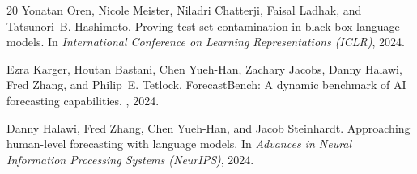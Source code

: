 \documentclass[10pt,conference]{IEEEtran}
\begin{document}
\begin{thebibliography}{20}
Yonatan Oren, Nicole Meister, Niladri Chatterji, Faisal Ladhak, and Tatsunori~B. Hashimoto.
\newblock Proving test set contamination in black-box language models.
\newblock In {\em International Conference on Learning Representations (ICLR)}, 2024.

Ezra Karger, Houtan Bastani, Chen Yueh-Han, Zachary Jacobs, Danny Halawi, Fred Zhang, and Philip~E. Tetlock.
\newblock ForecastBench: A dynamic benchmark of AI forecasting capabilities.
, 2024.

Danny Halawi, Fred Zhang, Chen Yueh-Han, and Jacob Steinhardt.
\newblock Approaching human-level forecasting with language models.
\newblock In {\em Advances in Neural Information Processing Systems (NeurIPS)}, 2024.

\end{thebibliography}
\end{document}
